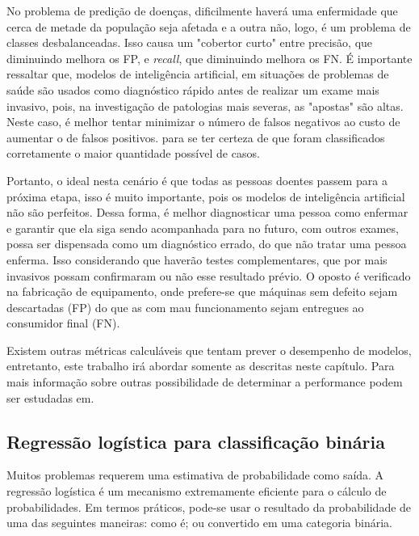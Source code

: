             No problema de predição de doenças, dificilmente haverá uma enfermidade que cerca de metade da população seja afetada e a outra não, logo, é um problema de classes desbalanceadas. Isso causa um "cobertor curto" entre precisão, que diminuindo melhora os FP, e \textit{recall}, que diminuindo melhora os FN. É importante ressaltar que, modelos de inteligência artificial, em situações de problemas de saúde são usados como diagnóstico rápido antes de realizar um exame mais invasivo, pois, na investigação de patologias mais severas, as "apostas" são altas. Neste caso, é melhor tentar minimizar o número de falsos negativos ao custo de aumentar o de falsos positivos. para se ter certeza de que foram classificados corretamente o maior quantidade possível de casos. 
            
            Portanto, o ideal nesta cenário é que todas as pessoas doentes passem para a próxima etapa, isso é muito importante, pois os modelos de inteligência artificial não são perfeitos. Dessa forma, é melhor diagnosticar uma pessoa como enfermar e garantir que ela siga sendo acompanhada para no futuro, com outros exames, possa ser dispensada como um diagnóstico errado, do que não tratar uma pessoa enferma. Isso considerando que haverão testes complementares, que por mais invasivos possam confirmaram ou não esse resultado prévio. O oposto é verificado na fabricação de equipamento, onde prefere-se que máquinas sem defeito sejam descartadas (FP) do que as com mau funcionamento sejam entregues ao consumidor final (FN).
            
            Existem outras métricas calculáveis que tentam prever o desempenho de modelos, entretanto, este trabalho irá abordar somente as descritas neste capítulo. Para mais informação sobre outras possibilidade de determinar a performance podem ser estudadas em. 
        
            
        \subsection{Regressão logística para classificação binária}
        
            Muitos problemas requerem uma estimativa de probabilidade como saída. A regressão logística é um mecanismo extremamente eficiente para o cálculo de probabilidades. Em termos práticos, pode-se usar o resultado da probabilidade de uma das seguintes maneiras: como é; ou convertido em uma categoria binária.
            
